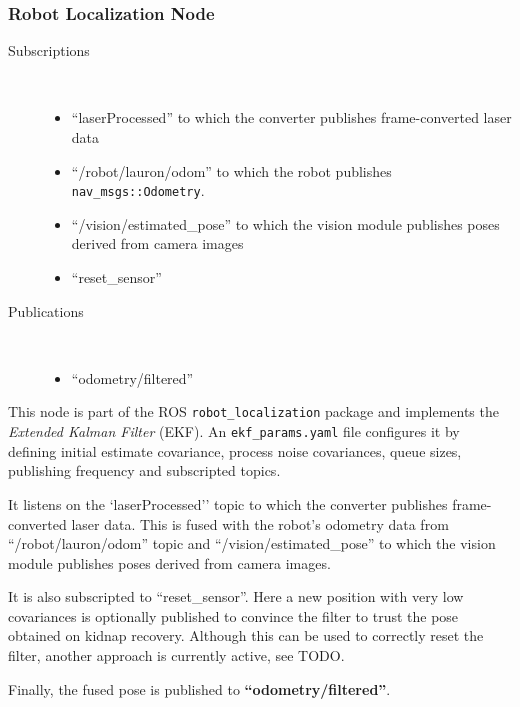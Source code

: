 \subsubsection{Robot Localization Node}
\begin{description}
\item[Subscriptions]\
\begin{itemize}
	\item ``laserProcessed'' to which the converter publishes frame-converted laser data
	\item``/robot/lauron/odom'' to which the robot publishes \texttt{nav\_msgs::Odometry}.
	\item ``/vision/estimated\_pose'' to which the vision module publishes poses derived
	 from camera images
	 \item ``reset_sensor''
\end{itemize}
	
\item[Publications]\
	\begin{itemize}
	\item ``odometry/filtered''
	\end{itemize}
\end{description}

This node is part of the ROS \texttt{robot\_localization} package and implements the \textit{Extended Kalman Filter} (EKF). An \texttt{ekf\_params.yaml} file configures it by defining initial estimate covariance, process noise covariances, queue sizes, publishing frequency and subscripted topics.

It listens on the `laserProcessed'' topic to which the converter publishes frame-converted laser data. This is fused with the robot's odometry data from ``/robot/lauron/odom'' topic and ``/vision/estimated\_pose'' to which the vision module publishes poses derived from camera images.

It is also subscripted to ``reset_sensor''. Here a new position with very low covariances is optionally published to convince the filter to trust the pose obtained on kidnap recovery. Although this can be used to correctly reset the filter, another approach is currently active, see TODO.

Finally, the fused pose is published to \textbf{``odometry/filtered''}.

